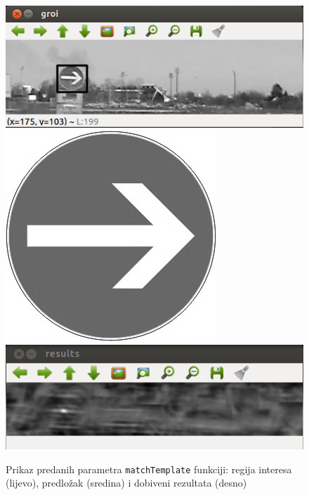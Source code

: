 \begin{figure}[!htb]
    \includegraphics[width=\linewidth]{figures/mt-groi.png}
\endminipage\hfill
{}
\endminipage\hfill
{}
    \includegraphics[width=\linewidth]{figures/znakg.png}
\endminipage\hfill
{}
\endminipage\hfill
{}
    \includegraphics[width=\linewidth]{figures/mt-results.png}
\endminipage\hfill

\caption{Prikaz predanih parametra \texttt{matchTemplate} funkciji:
regija interesa (lijevo), predložak (sredina)
i dobiveni rezultata (desno)}
\label{fig:mt}
\end{figure}

